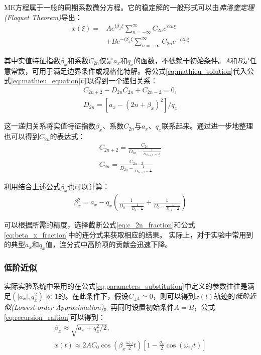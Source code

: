 ME方程属于一般的周期系数微分方程。它的稳定解的一般形式可以由\emph{弗洛奎定理(Floquet Theorem)}导出\cite[]{McLachlan, McQuarrie}：
\begin{align}
    x(\xi)=&Ae^{i\beta_x\xi}\sum_{n=-\infty}^{\infty}C_{2n}e^{i2n\xi}\\
    &+ Be^{-i\beta_x\xi}\sum_{n=-\infty}^{\infty}C_{2n}e^{-i2n\xi}\label{eq:mathieu_solution}
\end{align}

其中实值特征指数$\beta_x$和系数$C_{2n}$仅是$a_x$和$q_x$的函数，不依赖于初始条件。$A$和$B$是任意常数，可用于满足边界条件或规格化特解。将公式\eqref{eq:mathieu_solution}代入公式\eqref{eq:mathieu_equation}可以得到一个递归关系：
\begin{align}
    C_{2n+2}-D_{2n}C_{2n}+C_{2n-2}=0,\\
    D_{2n}=[a_x-(2n+\beta_x)^2]/q_x\label{eq:recursion_raltion}
\end{align}

这一递归关系将实值特征指数$\beta_x$、系数$C_{2n}$与$a_x$、$q_x$联系起来。通过进一步地整理也可以得到$C_{2n}$的表达式：
\begin{align}
    C_{2n+2}=\frac{C_{2n}}{D_{2n}-\frac{1}{D_{2n+2}-\frac{1}{\dots}}}\\
    C_{2n}=\frac{C_{2n-2}}{D_{2n}-\frac{1}{D_{2n-2}-\frac{1}{\dots}}}\label{eq:c_2n_fraction}
\end{align}

利用结合上述公式$\beta_x$也可以计算：
\begin{align}
    \beta_x^2=a_x-q_x\left(\frac{1}{D_0-\frac{1}{D_2-\frac{1}{\dots}}} + \frac{1}{D_0-\frac{1}{D_{-2}-\frac{1}{\dots}}}\right) \label{eq:beta_x_fraction}
\end{align}

可以根据所需的精度，选择截断公式\eqref{eq:c_2n_fraction}和公式\eqref{eq:beta_x_fraction}中的连分式来获取相应的结果。
实际上，对于实验中常用到的典型$a_x$和$q_x$值，连分式中高阶项的贡献会迅速下降。


\subsubsection[低阶近似]{低阶近似\label{section:lowest_order_approximation}}
实际实验系统中采用的在公式\eqref{eq:parameters_substitution}中定义的参数往往是满足$(|a_x|,q_x^2)\ll 1$的。在此条件下，假设$C_{\pm 4}\simeq 0$，则可以得到$x(t)$轨迹的\emph{低阶近似(Lowest-order Approximation)}。再同时设置初始条件$A=B$，公式\ref{eq:recursion_raltion}可以得到：
\begin{align}
    \beta_x\approx \sqrt{a_x+q_x^2/2},\\
    x(t)\approx2AC_0\cos\left(\beta_x\frac{\omega_{rf}}{2}t\right)\left[1-\frac{q_x}{2}\cos(\omega_{rf}t)\right]\label{eq:classical_motion_solution}
\end{align}

